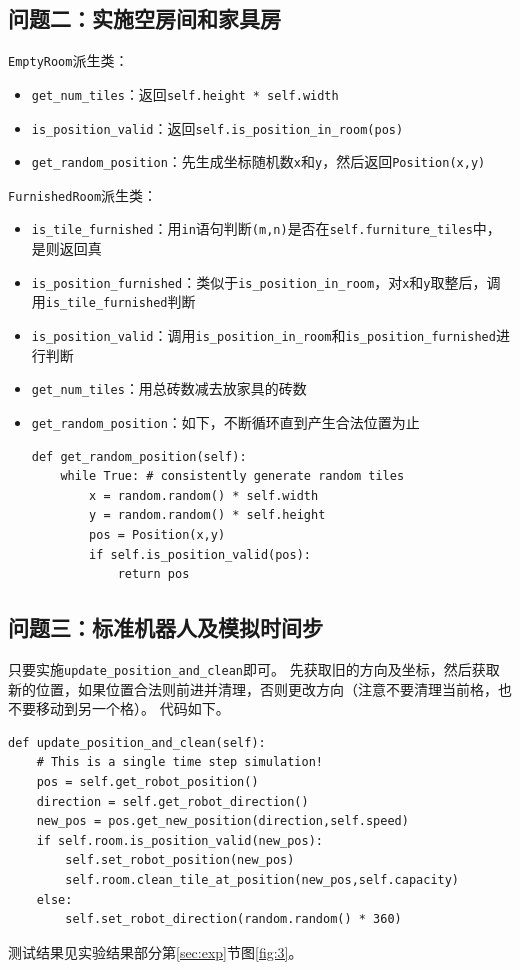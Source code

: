 \documentclass[logo,reportComp]{thesis}
\begin{document}
\subsection{问题二：实施空房间和家具房}
\verb'EmptyRoom'派生类：
\begin{itemize}
    \item \verb'get_num_tiles'：返回\verb'self.height * self.width'
    \item \verb'is_position_valid'：返回\verb'self.is_position_in_room(pos)'
    \item \verb'get_random_position'：先生成坐标随机数\verb'x'和\verb'y'，然后返回\verb'Position(x,y)'
\end{itemize}

\verb'FurnishedRoom'派生类：
\begin{itemize}
    \item \verb'is_tile_furnished'：用\verb'in'语句判断\verb'(m,n)'是否在\verb'self.furniture_tiles'中，是则返回真
    \item \verb'is_position_furnished'：类似于\verb'is_position_in_room'，对\verb'x'和\verb'y'取整后，调用\verb'is_tile_furnished'判断
    \item \verb'is_position_valid'：调用\verb'is_position_in_room'和\verb'is_position_furnished'进行判断
    \item \verb'get_num_tiles'：用总砖数减去放家具的砖数
    \item \verb'get_random_position'：如下，不断循环直到产生合法位置为止
\begin{lstlisting}
def get_random_position(self):
    while True: # consistently generate random tiles
        x = random.random() * self.width
        y = random.random() * self.height
        pos = Position(x,y)
        if self.is_position_valid(pos):
            return pos
\end{lstlisting}
\end{itemize}

\subsection{问题三：标准机器人及模拟时间步}
只要实施\verb'update_position_and_clean'即可。
先获取旧的方向及坐标，然后获取新的位置，如果位置合法则前进并清理，否则更改方向（注意不要清理当前格，也不要移动到另一个格）。
代码如下。
\begin{lstlisting}
def update_position_and_clean(self):
    # This is a single time step simulation!
    pos = self.get_robot_position()
    direction = self.get_robot_direction()
    new_pos = pos.get_new_position(direction,self.speed)
    if self.room.is_position_valid(new_pos):
        self.set_robot_position(new_pos)
        self.room.clean_tile_at_position(new_pos,self.capacity)
    else:
        self.set_robot_direction(random.random() * 360)
\end{lstlisting}
测试结果见实验结果部分第\ref{sec:exp}节图\ref{fig:3}。
\end{document}
